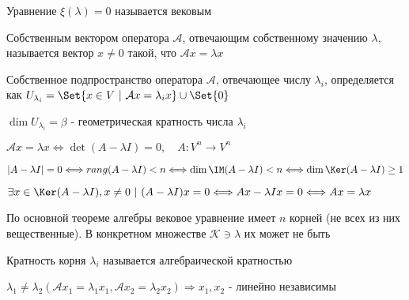 \documentclass[12pt]{article}
\begin{document}
    \Nota Уравнение $\xi(\lambda) = 0$ называется вековым

    \hypertarget{eigenvector}{}

    \Def Собственным вектором оператора $\mathcal{A}$, отвечающим собственному значению $\lambda$,
    называется вектор $x \neq 0$ такой, что $\mathcal{A}x = \lambda x$

    \Defs Собственное подпространство оператора $\mathcal{A}$, отвечающее числу $\lambda_i$, определяется как $U_{\lambda_i} = \Set{x \in V \ | \ \mathcal{A}x = \lambda_i x} \union \Set{0}$

    \Defs $\dim U_{\lambda_i} = \beta$ - геометрическая кратность числа $\lambda_i$

    \begin{MyTheorem}
        \Ths $\mathcal{A}x = \lambda x \Longleftrightarrow \det(A - \lambda I) = 0, \quad A : V^n \rightarrow V^n$
    \end{MyTheorem}

    \begin{MyProof}
        $|A - \lambda I| = 0 \Longleftrightarrow rang (A - \lambda I) < n \Longleftrightarrow
        \dim \IM (A - \lambda I) < n \Longleftrightarrow \dim \Ker (A - \lambda I) \geq 1$

        $\exists x \in \Ker (A - \lambda I), x \neq 0 \ | \ (A - \lambda I) x = 0 \Longleftrightarrow Ax - \lambda I x = 0 \Longleftrightarrow Ax = \lambda x$
    \end{MyProof}

    \Nota По основной теореме алгебры вековое уравнение имеет $n$ корней (не всех из них вещественные).
    В конкретном множестве $\mathcal{K} \ni \lambda$ их может не быть

    \Def Кратность корня $\lambda_i$ называется алгебраической кратностью

    \begin{MyTheorem}
        \Ths $\lambda_1 \neq \lambda_2 (\mathcal{A}x_1 = \lambda_1 x_1, \mathcal{A}x_2 = \lambda_2 x_2) \Longrightarrow x_1, x_2$ - линейно независимы
    \end{MyTheorem}
\end{document}
